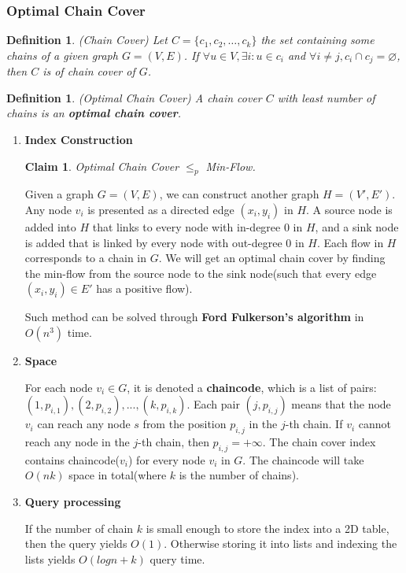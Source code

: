 \documentclass[11pt]{article}
\newtheorem{definition}[theorem]{Definition}
\newtheorem{claim}[theorem]{Claim}
\begin{document}
\subsubsection{Optimal Chain Cover}
\begin{definition} {(Chain Cover)}
	Let $C=\{c_1,c_2,…,c_k\}$ the set containing some chains of a given graph $G=(V,E)$. If $\forall u \in V, \exists i:u\in c_i$ and $\forall i \neq j, c_i \cap c_j = \varnothing$, then $C$ is of chain cover of $G$.
\end{definition}
\begin{definition} {(Optimal Chain Cover)}
	A chain cover $C$ with least number of chains is an \textbf{optimal chain cover}.
\end{definition}
\begin{enumerate}
	\item \textbf{Index Construction}
	\begin{claim}
	Optimal Chain Cover ${\leq}_p$ Min-Flow.
	\end{claim}
	Given a graph $G=(V,E)$, we can construct another graph $H=(V',E')$. Any node $v_i$ is presented as a directed edge $(x_i, y_i)$ in $H$. A source node is added
	into $H$ that links to every node with in-degree 0 in $H$, and a sink node is added
	that is linked by every node with out-degree 0 in $H$. Each flow in $H$ corresponds to a chain in $G$. We will get an optimal chain cover by finding the min-flow from the source node to the sink node(such that every edge $(x_i, y_i)\in E'$ has a positive flow). 
	
	Such method can be solved through \textbf{Ford Fulkerson’s algorithm} in $O(n^3)$ time.
	\item \textbf{Space}
	
	For each node $v_i\in G$, it is denoted a \textbf{chaincode}, which is a list of pairs: ${(1, p_{i, 1}), (2, p_{i, 2}), ..., (k, p_{i,k})}$. Each pair $(j, p_{i,j})$ means that the node $v_i$ can reach any node $s$ from the position $p_{i,j}$ in the $j$-th chain. If $v_i$ cannot reach any node in the $j$-th chain, then $p_{i,j} = +\infty$. The chain cover index contains chaincode($v_i$) for every node $v_i$ in $G$.
	The chaincode will take $O(nk)$ space in total(where $k$ is the number of chains). 
	\item \textbf{Query processing}
	
	If the number of chain $k$ is small enough to store the index into a 2D table, then the query yields $O(1)$. Otherwise storing it into lists and indexing the lists yields $O(logn+k)$ query time.
	
\end{enumerate}
\end{document}
